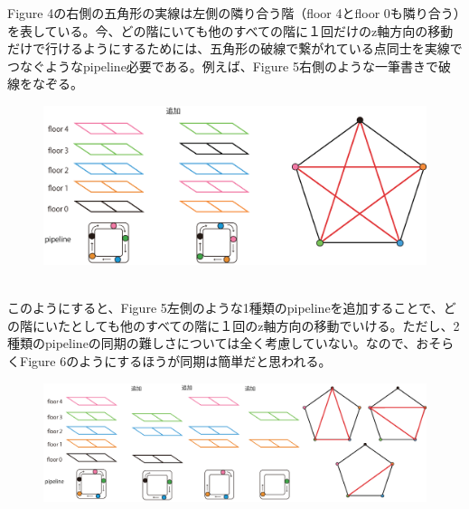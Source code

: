 \documentclass[a4paper,10.5pt]{ltjsarticle}
\begin{document}
Figure 4の右側の五角形の実線は左側の隣り合う階（floor 4とfloor 0も隣り合う）を表している。今、どの階にいても他のすべての階に１回だけのz軸方向の移動だけで行けるようにするためには、五角形の破線で繋がれている点同士を実線でつなぐようなpipeline必要である。例えば、Figure 5右側のような一筆書きで破線をなぞる。
\clearpage
\begin{figure}[h]
  \hspace{-80pt}\includegraphics[scale=0.55]{figure5.eps}
  \vspace{-15pt}\caption{}
\end{figure}\\
このようにすると、Figure 5左側のような1種類のpipelineを追加することで、どの階にいたとしても他のすべての階に１回のz軸方向の移動でいける。ただし、2種類のpipelineの同期の難しさについては全く考慮していない。なので、おそらくFigure 6のようにするほうが同期は簡単だと思われる。\\
\vspace{-70pt}\begin{figure}[h]
  \hspace{-70pt}\includegraphics[scale=0.4]{figure6.eps}
  \vspace{-15pt}\caption{}
\end{figure}\\
\end{document}
